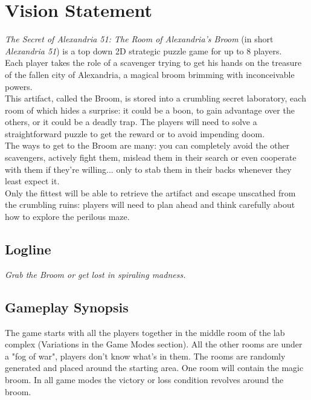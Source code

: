 \section{Vision Statement}

\textit{The Secret of Alexandria 51: The Room of Alexandria’s Broom} (in short \textit{Alexandria 51}) is a top down 2D strategic puzzle game for up to 8 players. \\

Each player takes the role of a scavenger trying to get his hands on the treasure of the fallen city of Alexandria, a magical broom brimming with inconceivable powers. \\

This artifact, called the Broom, is stored into a crumbling secret laboratory, each room of which hides a surprise: it could be a boon, to gain advantage over the others, or it could be a deadly trap. The players will need to solve a straightforward puzzle to get the reward or to avoid impending doom. \\

The ways to get to the Broom are many: you can completely avoid the other scavengers, actively fight them, mislead them in their search or even cooperate with them if they're willing... only to stab them in their backs whenever they least expect it. \\

Only the fittest will be able to retrieve the artifact and escape unscathed from the crumbling ruins: players will need to plan ahead and think carefully about how to explore the perilous maze.

\subsection{Logline}

\textit{Grab the Broom or get lost in spiraling madness.}

\subsection{Gameplay Synopsis}

The game starts with all the players together in the middle room of the lab complex (Variations in the Game Modes section). All the other rooms are
under a "fog of war", players don't know what's in them. The rooms are randomly generated and placed
around the starting area. One room will contain the magic broom. In all game modes the victory or loss condition revolves around the broom.\\


